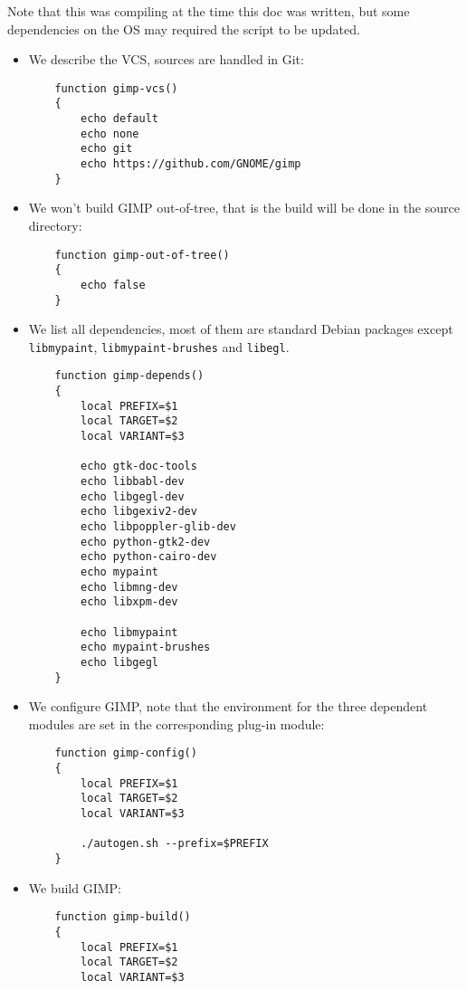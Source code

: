 \documentclass[a4paper,12pt,twoside]{article}
\newcommand{\code}[1]{\texttt{#1}}
\begin{document}
Note that this was compiling at the time this doc was written, but some dependencies on the OS may required the script to be updated.

\begin{itemize}
	\item We describe the VCS, sources are handled in Git:

	\begin{lstlisting}
	function gimp-vcs()
	{
		echo default
		echo none
		echo git
		echo https://github.com/GNOME/gimp
	}
	\end{lstlisting}

	\item We won't build GIMP out-of-tree, that is the build will be done in the source directory:

	\begin{lstlisting}
	function gimp-out-of-tree()
	{
		echo false
	}
	\end{lstlisting}

	\item We list all dependencies, most of them are standard Debian packages except \code{libmypaint}, \code{libmypaint-brushes} and \code{libegl}.

	\begin{lstlisting}
	function gimp-depends()
	{
		local PREFIX=$1
		local TARGET=$2
		local VARIANT=$3

		echo gtk-doc-tools
		echo libbabl-dev
		echo libgegl-dev
		echo libgexiv2-dev
		echo libpoppler-glib-dev
		echo python-gtk2-dev
		echo python-cairo-dev
		echo mypaint
		echo libmng-dev
		echo libxpm-dev

		echo libmypaint
		echo mypaint-brushes
		echo libgegl
	}
	\end{lstlisting}

	\item We configure GIMP, note that the environment for the three dependent modules are set in the corresponding plug-in module:

	\begin{lstlisting}
	function gimp-config()
	{
		local PREFIX=$1
		local TARGET=$2
		local VARIANT=$3

		./autogen.sh --prefix=$PREFIX
	}
	\end{lstlisting}

	\item We build GIMP:

	\begin{lstlisting}
	function gimp-build()
	{
		local PREFIX=$1
		local TARGET=$2
		local VARIANT=$3


\end{lstlisting}
\end{itemize}
\end{document}
